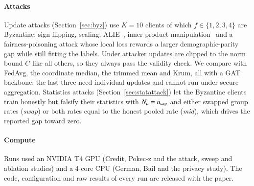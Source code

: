 \paragraph{Attacks}
Update attacks (Section~\ref{sec:byz}) use $K=10$ clients of which $f\in\{1,2,3,4\}$ are Byzantine: sign flipping, scaling, ALIE~\citep{baruch2019little}, inner-product manipulation~\citep{xie2019fall} and a fairness-poisoning attack whose local loss rewards a larger demographic-parity gap while still fitting the labels. Under \clamp{} attacker updates are clipped to the norm bound $C$ like all others, so they always pass the validity check. We compare \clamp{} with FedAvg, the coordinate median, the trimmed mean and Krum, all with a GAT backbone; the last three need individual updates and cannot run under secure aggregation. Statistics attacks (Section~\ref{sec:statattack}) let the Byzantine clients train honestly but falsify their statistics with $N_a=n_{\mathrm{cap}}$ and either swapped group rates (\emph{swap}) or both rates equal to the honest pooled rate (\emph{mid}), which drives the reported gap toward zero.

\paragraph{Compute}
Runs used an NVIDIA T4 GPU (Credit, Pokec-z and the attack, sweep and ablation studies) and a 4-core CPU (German, Bail and the privacy study). The code, configuration and raw results of every run are released with the paper.
